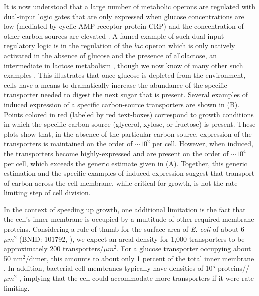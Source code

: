 It is now understood that a large number of metabolic operons are regulated
with dual-input logic gates that are only expressed when glucose
concentrations are low (mediated by cyclic-AMP receptor protein CRP) and the
concentration of other carbon sources are elevated \citep{gama-castro2016, zhang2014a}. A
famed example of such dual-input regulatory logic is in the regulation of the
\textit{lac} operon which is only natively activated in the absence of glucose and the
presence of allolactose, an intermediate in lactose metabolism \citep{jacob1961}, though
we now know of many other such examples \citep{ireland2020, gama-castro2016,
belliveau2018}. This illustrates that once glucose is depleted from the
environment, cells have a means to dramatically increase the abundance of the
specific transporter needed to digest the next sugar that is present. Several
examples of induced expression of a specific carbon-source transporters are
shown in (B). Points colored in red (labeled by red
text-boxes) correspond to growth conditions in which the specific carbon source
(glycerol, xylose, or fructose) is present. These plots show that, in the
absence of the particular carbon source, expression of the transporters is
maintained on the order of $\sim 10^2$ per cell. However, when induced, the
transporters become highly-expressed and are present on the order of $\sim
10^4$ per cell, which exceeds the generic estimate given in
(A). Together, this generic estimation and the specific
examples of induced expression suggest that transport of carbon across the cell
membrane, while critical for growth, is not the rate-limiting step of cell division.

In the context of speeding up growth, one additional limitation  is the fact
that the cell's inner membrane is occupied by a multitude of other required
membrane proteins. Considering a rule-of-thumb for the surface area of
\textit{E. coli} of about 6 $\mu m^2$ (BNID: 101792, \cite{milo2010}), we expect
an areal density for 1,000 transporters to be approximately 200
transporters/$\mu m^2$. For a glucose transporter occupying about 50
nm$^2$/dimer, this amounts to about only 1 percent of the total inner membrane
\citep{szenk2017}. In addition, bacterial cell membranes typically have
densities of 10$^5$ proteins//$\mu m^2$ \citep{phillips2018}, implying that the
cell could accommodate more transporters if it were rate limiting.

